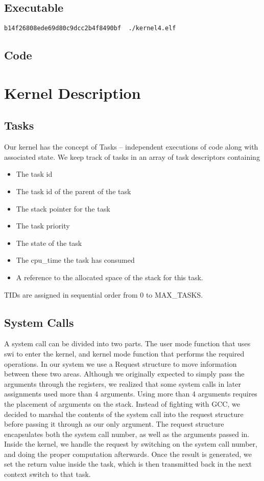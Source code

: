 \documentclass{article}
\begin{document}
\subsection{Executable}
\begin{verbatim}
b14f26808ede69d80c9dcc2b4f8490bf  ./kernel4.elf
\end{verbatim}

\subsection{Code}

\section{Kernel Description}

\subsection{Tasks}

Our kernel has the concept of Tasks -- independent executions of code along with associated state. We keep track of tasks in an array of task descriptors containing

\begin{itemize}
  \item The task id
  \item The task id of the parent of the task
  \item The stack pointer for the task
  \item The task priority
  \item The state of the task
  \item The cpu\_time the task has consumed
  \item A reference to the allocated space of the stack for this task.
\end{itemize}

TIDs are assigned in sequential order from 0 to MAX_TASKS.

\subsection{System Calls}

A system call can be divided into two parts. The user mode function that uses swi to enter the kernel, and kernel mode function that performs the required operations. In our system we use a Request structure to move information between these two areas. Although we originally expected to simply pass the arguments through the registers, we realized that some system calls in later assignments used more than 4 arguments. Using more than 4 arguments requires the placement of arguments on the stack. Instead of fighting with GCC, we decided to marshal the contents of the system call into the request structure before passing it through as our only argument. The request structure encapsulates both the system call number, as well as the arguments passed in. Inside the kernel, we handle the request by switching on the system call number, and doing the proper computation afterwards. Once the result is generated, we set the return value inside the task, which is then transmitted back in the next context switch to that task.
\end{document}
